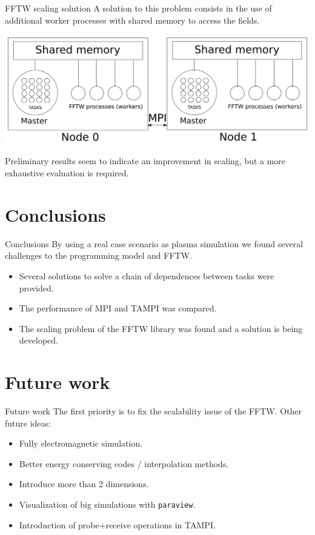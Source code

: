 \documentclass{beamer}
\begin{document}
\begin{frame}{FFTW scaling solution}
A solution to this problem consists in the use of additional worker processes 
with shared memory to access the fields.
\begin{center}
\includegraphics[width=\textwidth]{tap.png}
\end{center}
Preliminary results seem to indicate an improvement in scaling, but a more 
exhaustive evaluation is required.
\end{frame}

\section{Conclusions}

\begin{frame}{Conclusions}
By using a real case scenario as plasma simulation we found several challenges 
to the programming model and FFTW.
\begin{itemize}
\item Several solutions to solve a chain of dependences between tasks were 
provided.
\item The performance of MPI and TAMPI was compared.
\item The scaling problem of the FFTW library was found and a solution is being 
developed.
\end{itemize}
\end{frame}

\section{Future work}

\begin{frame}{Future work}
The first priority is to fix the scalability issue of the FFTW. Other future 
ideas:
\begin{itemize}
\item Fully electromagnetic simulation.
\item Better energy conserving codes / interpolation methods.
\item Introduce more than 2 dimensions.
\item Visualization of big simulations with \texttt{paraview}.
\item Introduction of probe+receive operations in TAMPI.
\end{itemize}
\end{frame}
\end{document}
